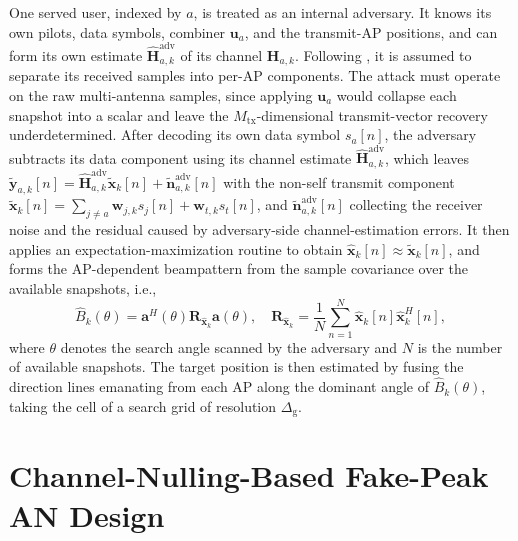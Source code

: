 \documentclass[letterpaper,journal]{IEEEtran}
\begin{document}
One served user, indexed by $a$, is treated as an internal adversary. It knows its own pilots, data symbols, combiner $\mathbf{u}_a$, and the transmit-AP positions, and can form its own estimate $\widehat{\mathbf{H}}_{a,k}^{\mathrm{adv}}$ of its channel $\mathbf{H}_{a,k}$. Following \cite{dasilva2023multistaticcf}, it is assumed to separate its received samples into per-AP components. The attack must operate on the raw multi-antenna samples, since applying $\mathbf{u}_a$ would collapse each snapshot into a scalar and leave the $M_{\mathrm{tx}}$-dimensional transmit-vector recovery underdetermined. After decoding its own data symbol $s_a[n]$, the adversary subtracts its data component using its channel estimate $\widehat{\mathbf{H}}_{a,k}^{\mathrm{adv}}$, which leaves $\widetilde{\mathbf{y}}_{a,k}[n]=\widehat{\mathbf{H}}_{a,k}^{\mathrm{adv}}\widetilde{\mathbf{x}}_k[n]+\widetilde{\mathbf{n}}_{a,k}^{\mathrm{adv}}[n]$ with the non-self transmit component $\widetilde{\mathbf{x}}_k[n]=\sum_{j\neq a}\mathbf{w}_{j,k}s_j[n]+\mathbf{w}_{t,k}s_t[n]$, and $\widetilde{\mathbf{n}}_{a,k}^{\mathrm{adv}}[n]$ collecting the receiver noise and the residual caused by adversary-side channel-estimation errors. It then applies an expectation-maximization routine to obtain $\widehat{\mathbf{x}}_k[n]\approx\widetilde{\mathbf{x}}_k[n]$, and forms the AP-dependent beampattern from the sample covariance over the available snapshots, i.e.,
\begin{equation}
\widehat{B}_k(\theta)=\mathbf{a}^H(\theta)\mathbf{R}_{\widehat{\mathbf{x}}_k}\mathbf{a}(\theta),\quad \mathbf{R}_{\widehat{\mathbf{x}}_k}=\frac{1}{N}\sum_{n=1}^{N}\widehat{\mathbf{x}}_k[n]\widehat{\mathbf{x}}_k^H[n],
\label{eq:beampattern}
\end{equation}
where $\theta$ denotes the search angle scanned by the adversary and $N$ is the number of available snapshots. The target position is then estimated by fusing the direction lines emanating from each AP along the dominant angle of $\widehat{B}_k(\theta)$, taking the cell of a search grid of resolution $\Delta_{\mathrm{g}}$.

\section{Channel-Nulling-Based Fake-Peak AN Design}
\label{sec:design}
\label{sec:nulling}
\end{document}

